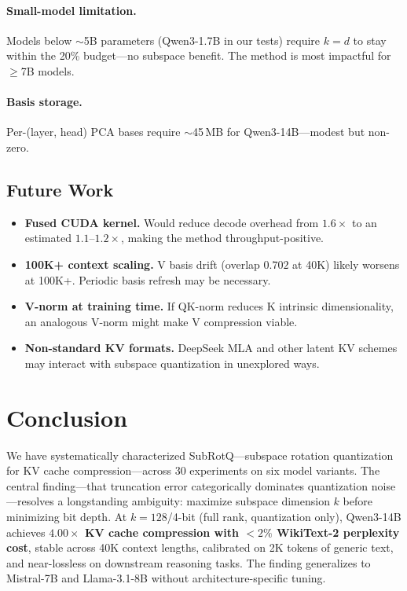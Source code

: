 \documentclass{article}
\begin{document}
\paragraph{Small-model limitation.} Models below $\sim$5B parameters (Qwen3-1.7B
in our tests) require $k{=}d$ to stay within the 20\% budget---no subspace benefit.
The method is most impactful for $\geq$7B models.

\paragraph{Basis storage.} Per-(layer, head) PCA bases require $\sim$45\,MB for
Qwen3-14B---modest but non-zero.

\subsection{Future Work}
\label{sec:future}

\begin{itemize}[itemsep=2pt]
  \item \textbf{Fused CUDA kernel.} Would reduce decode overhead from $1.6{\times}$ to
    an estimated $1.1$--$1.2{\times}$, making the method throughput-positive.
  \item \textbf{100K+ context scaling.} V basis drift (overlap $0.702$ at 40K)
    likely worsens at 100K+. Periodic basis refresh may be necessary.
  \item \textbf{V-norm at training time.} If QK-norm reduces K intrinsic
    dimensionality, an analogous V-norm might make V compression viable.
  \item \textbf{Non-standard KV formats.} DeepSeek MLA \cite{deepseek2024} and
    other latent KV schemes may interact with subspace quantization in unexplored ways.
\end{itemize}

\section{Conclusion}
\label{sec:conclusion}

We have systematically characterized SubRotQ---subspace rotation
quantization for KV cache compression---across 30 experiments on six model
variants. The central finding---that truncation error categorically dominates
quantization noise---resolves a longstanding ambiguity: maximize subspace
dimension $k$ before minimizing bit depth. At $k{=}128$/4-bit (full rank,
quantization only), Qwen3-14B achieves \textbf{$4.00{\times}$ KV cache compression
with $<2\%$ WikiText-2 perplexity cost}, stable across 40K context lengths,
calibrated on 2K tokens of generic text, and near-lossless on downstream reasoning
tasks. The finding generalizes to Mistral-7B and Llama-3.1-8B without
architecture-specific tuning.
\end{document}
